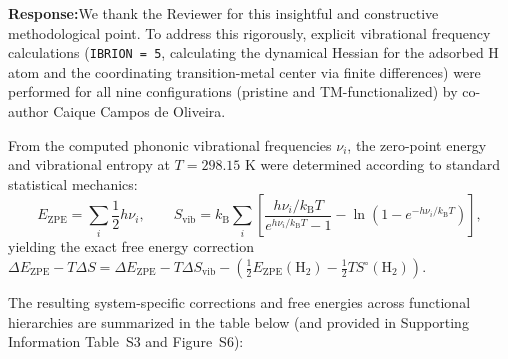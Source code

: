 \documentclass[11pt, sans, a4paper]{moderncv}
\newcommand{\response}{\vspace{0.4em}\noindent\textbf{\color{actionblue}Response:}\hspace{0.5em}}
\begin{document}
\response We thank the Reviewer for this insightful and constructive methodological point. To address this rigorously, explicit vibrational frequency calculations (\texttt{IBRION = 5}, calculating the dynamical Hessian for the adsorbed H atom and the coordinating transition-metal center via finite differences) were performed for all nine configurations (pristine and TM-functionalized) by co-author Caique Campos de Oliveira.

From the computed phononic vibrational frequencies $\nu_i$, the zero-point energy and vibrational entropy at $T = 298.15\text{ K}$ were determined according to standard statistical mechanics:
\begin{equation}
  E_{\text{ZPE}} = \sum_i \frac{1}{2} h \nu_i, \qquad
  S_{\text{vib}} = k_{\mathrm{B}} \sum_i \left[ \frac{h \nu_i / k_{\mathrm{B}} T}{e^{h \nu_i / k_{\mathrm{B}} T} - 1} - \ln \left(1 - e^{-h \nu_i / k_{\mathrm{B}} T}\right) \right],
\end{equation}
yielding the exact free energy correction $\Delta E_{\text{ZPE}} - T\Delta S = \Delta E_{\text{ZPE}} - T\Delta S_{\text{vib}} - \left(\frac{1}{2} E_{\text{ZPE}}(\text{H}_2) - \frac{1}{2} T S^\circ(\text{H}_2)\right)$.

The resulting system-specific corrections and free energies across functional hierarchies are summarized in the table below (and provided in Supporting Information Table~S3 and Figure~S6):
\end{document}
